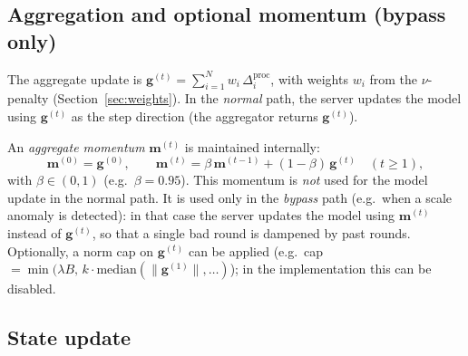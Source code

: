 \documentclass[11pt,a4paper]{article}
\begin{document}
\subsection{Aggregation and optional momentum (bypass only)}

The aggregate update is $\mathbf{g}^{(t)} = \sum_{i=1}^{N} w_i\,\Delta_i^{\mathrm{proc}}$, with weights $w_i$ from the $\nu$-penalty (Section~\ref{sec:weights}). In the \emph{normal} path, the server updates the model using $\mathbf{g}^{(t)}$ as the step direction (the aggregator returns $\mathbf{g}^{(t)}$).

An \emph{aggregate momentum} $\mathbf{m}^{(t)}$ is maintained internally:
\begin{equation}
  \mathbf{m}^{(0)} = \mathbf{g}^{(0)}, \qquad
  \mathbf{m}^{(t)} = \beta\,\mathbf{m}^{(t-1)} + (1-\beta)\,\mathbf{g}^{(t)} \quad (t \ge 1),
\end{equation}
with $\beta \in (0,1)$ (e.g.\ $\beta = 0.95$). This momentum is \emph{not} used for the model update in the normal path. It is used only in the \emph{bypass} path (e.g.\ when a scale anomaly is detected): in that case the server updates the model using $\mathbf{m}^{(t)}$ instead of $\mathbf{g}^{(t)}$, so that a single bad round is dampened by past rounds. Optionally, a norm cap on $\mathbf{g}^{(t)}$ can be applied (e.g.\ cap $= \min(\lambda B,\, k \cdot \mathrm{median}(\|\mathbf{g}^{(1)}\|,\ldots)$); in the implementation this can be disabled.


\subsection{State update}
\end{document}
